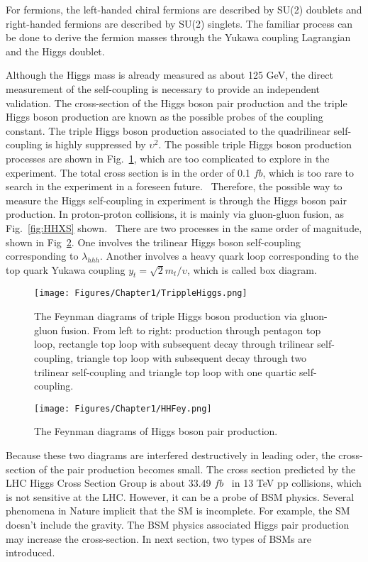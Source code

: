 For fermions, the left-handed chiral fermions are described by SU(2) doublets and right-handed fermions are described by SU(2) singlets.
The familiar process can be done to derive the fermion masses through the Yukawa coupling Lagrangian and the Higgs doublet.

Although the Higgs mass is already measured as about 125 GeV, the direct measurement of the self-coupling is necessary to provide an independent validation.
The cross-section of the Higgs boson pair production and the triple Higgs boson production are known as the possible probes of the coupling constant.
The triple Higgs boson production associated to the quadrilinear self-coupling is highly suppressed by $\upsilon^{2}$.
The possible triple Higgs boson production processes are shown in Fig.~\ref{fig:TrippleHiggs}, which are too complicated to explore in the experiment.
The total cross section is in the order of 0.1 $fb$, which is too rare to search in the experiment in a foreseen future.~\cite{1408.6542}
Therefore, the possible way to measure the Higgs self-coupling in experiment is through the Higgs boson pair production.
In proton-proton collisions, it is mainly via gluon-gluon fusion, as Fig.~\ref{fig:HHXS} shown.~\cite{1212.5581,1401.7340}
There are two processes in the same order of magnitude, shown in Fig~\ref{fig:HHFey}.
One involves the trilinear Higgs boson self-coupling corresponding to $\lambda_{hhh}$.
Another involves a heavy quark loop corresponding to the top quark Yukawa coupling $y_{t} = \sqrt{2}m_{t}/\upsilon$, which is called box diagram.
\begin{figure}[h]
  \centering
  \texttt{[image: Figures/Chapter1/TrippleHiggs.png]}
  \caption{The Feynman diagrams of triple Higgs boson production via gluon-gluon fusion. From left to right: production through pentagon top loop, rectangle top loop with subsequent decay through trilinear self-coupling, triangle top loop with subsequent decay through two trilinear self-coupling and triangle top loop with one quartic self-coupling.}
  \label{fig:TrippleHiggs}
\end{figure}

\begin{figure}[h]
  \centering
  \texttt{[image: Figures/Chapter1/HHFey.png]}
  \caption{The Feynman diagrams of Higgs boson pair production. }
  \label{fig:HHFey}
\end{figure}
Because these two diagrams are interfered destructively in leading oder, the cross-section of the pair production becomes small.
The cross section predicted by the LHC Higgs Cross Section Group is about 33.49 $fb$~\cite{1610.07922} in 13 TeV pp collisions, which is not sensitive at the LHC.
However, it can be a probe of BSM physics.
Several phenomena in Nature implicit that the SM is incomplete. For example, the SM doesn't include the gravity.
The BSM physics associated Higgs pair production may increase the cross-section.
In next section, two types of BSMs are introduced.

